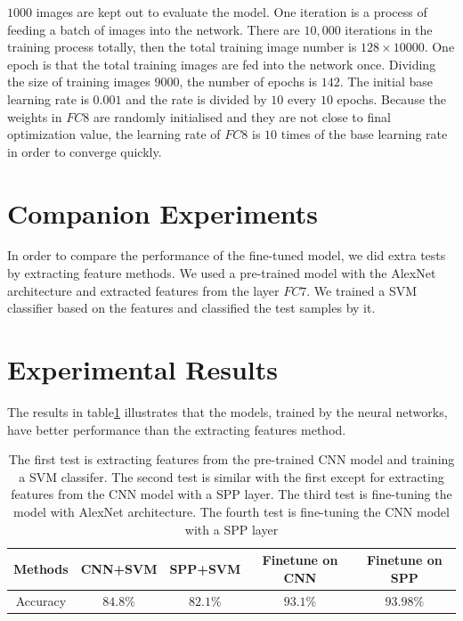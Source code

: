 $1000$ images are kept out to evaluate the model. One iteration is a process of feeding a batch of images into the network. There are $10,000$ iterations in the training process totally, then the total training image number is $128\times10000$. One epoch is that the total training images are fed into the network once. Dividing the size of training images $9000$, the number of epochs is $142$. The initial base learning rate is $0.001$ and the rate is divided by $10$ every $10$ epochs. Because the weights in $FC8$ are randomly initialised and they are not close to final optimization value, the learning rate of $FC8$ is $10$ times of the base learning rate in order to converge quickly.

\section{Companion Experiments}

In order to compare the performance of the fine-tuned model, we did extra tests by extracting feature methods. We used a pre-trained model with the AlexNet architecture and extracted features from the layer $FC7$. We trained a SVM classifier based on the features and classified the test samples by it.

\section{Experimental Results}

The results in table\ref{ExpRes} illustrates that the models, trained by the neural networks, have better performance than the extracting features method. 

\begin{table}[h]
\begin{center}
    \begin{tabular}{| c | c | c | c | c |}
    \hline
    Methods & CNN+SVM & SPP+SVM & Finetune on CNN & Finetune on SPP  \\ \hline
    Accuracy & $84.8\%$ & $82.1\%$ & $93.1\%$ & $93.98\%$ \\ \hline
    \end{tabular}
    \caption{The first test is extracting features from the pre-trained CNN model and training a SVM classifer. The second test is similar with the first except for extracting features from the CNN model with a SPP layer. The third test is fine-tuning the model with AlexNet architecture. The fourth test is fine-tuning the CNN model with a SPP layer}
    \label{ExpRes}
\end{center}
\end{table}

